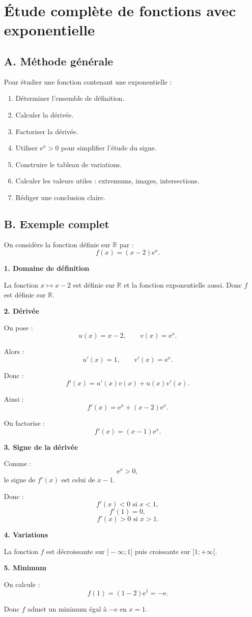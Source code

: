 \documentclass[11pt,a4paper]{article}
\newcommand{\R}{\mathbb{R}}
\newcommand{\e}{\mathrm{e}}
\begin{document}
\section{Étude complète de fonctions avec exponentielle}

\subsection*{A. Méthode générale}

\begin{methode}
Pour étudier une fonction contenant une exponentielle :
\begin{enumerate}
    \item Déterminer l'ensemble de définition.
    \item Calculer la dérivée.
    \item Factoriser la dérivée.
    \item Utiliser $\e^x>0$ pour simplifier l'étude du signe.
    \item Construire le tableau de variations.
    \item Calculer les valeurs utiles : extremums, images, intersections.
    \item Rédiger une conclusion claire.
\end{enumerate}
\end{methode}

\subsection*{B. Exemple complet}

\begin{exemplebox}
On considère la fonction définie sur $\R$ par :
\[
f(x)=(x-2)\e^x.
\]

\textbf{1. Domaine de définition}

La fonction $x\mapsto x-2$ est définie sur $\R$ et la fonction exponentielle aussi. Donc $f$ est définie sur $\R$.

\textbf{2. Dérivée}

On pose :
\[
u(x)=x-2,
\qquad
v(x)=\e^x.
\]

Alors :
\[
u'(x)=1,
\qquad
v'(x)=\e^x.
\]

Donc :
\[
f'(x)=u'(x)v(x)+u(x)v'(x).
\]

Ainsi :
\[
f'(x)=\e^x+(x-2)\e^x.
\]

On factorise :
\[
f'(x)=(x-1)\e^x.
\]

\textbf{3. Signe de la dérivée}

Comme :
\[
\e^x>0,
\]
le signe de $f'(x)$ est celui de $x-1$.

Donc :
\[
f'(x)<0 \text{ si } x<1,
\]
\[
f'(1)=0,
\]
\[
f'(x)>0 \text{ si } x>1.
\]

\textbf{4. Variations}

La fonction $f$ est décroissante sur $]-\infty;1]$ puis croissante sur $[1;+\infty[$.

\textbf{5. Minimum}

On calcule :
\[
f(1)=(1-2)\e^1=-\e.
\]

Donc $f$ admet un minimum égal à $-\e$ en $x=1$.
\end{exemplebox}
\end{document}
